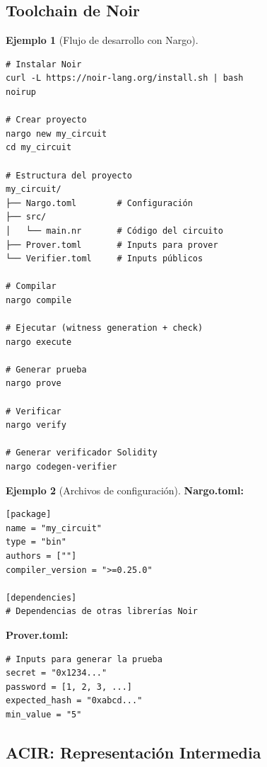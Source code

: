 \documentclass[11pt,a4paper,twoside,openright]{book}
\theoremstyle{definition}
\newtheorem{example}{Ejemplo}[chapter]
\theoremstyle{plain}
\theoremstyle{remark}
\begin{document}
\subsection{Toolchain de Noir}

\begin{example}[Flujo de desarrollo con Nargo]
\begin{verbatim}
# Instalar Noir
curl -L https://noir-lang.org/install.sh | bash
noirup

# Crear proyecto
nargo new my_circuit
cd my_circuit

# Estructura del proyecto
my_circuit/
├── Nargo.toml        # Configuración
├── src/
│   └── main.nr       # Código del circuito
├── Prover.toml       # Inputs para prover
└── Verifier.toml     # Inputs públicos

# Compilar
nargo compile

# Ejecutar (witness generation + check)
nargo execute

# Generar prueba
nargo prove

# Verificar
nargo verify

# Generar verificador Solidity
nargo codegen-verifier
\end{verbatim}
\end{example}

\begin{example}[Archivos de configuración]
\textbf{Nargo.toml:}
\begin{verbatim}
[package]
name = "my_circuit"
type = "bin"
authors = [""]
compiler_version = ">=0.25.0"

[dependencies]
# Dependencias de otras librerías Noir
\end{verbatim}

\textbf{Prover.toml:}
\begin{verbatim}
# Inputs para generar la prueba
secret = "0x1234..."
password = [1, 2, 3, ...]
expected_hash = "0xabcd..."
min_value = "5"
\end{verbatim}
\end{example}

\subsection{ACIR: Representación Intermedia}
\end{document}
